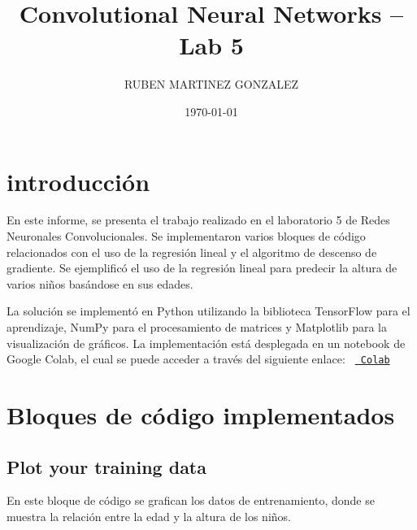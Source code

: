 \documentclass{article}
\title{Convolutional Neural Networks – Lab 5}
\author{RUBEN MARTINEZ GONZALEZ}
\date{\today}
\begin{document}
    \maketitle


    \section{introducción}\label{sec:introduccion}
    En este informe, se presenta el trabajo realizado en el laboratorio 5 de Redes Neuronales Convolucionales.
    Se implementaron varios bloques de código relacionados con el uso de la regresión lineal y el algoritmo de descenso de gradiente.
    Se ejemplificó el uso de la regresión lineal para predecir la altura de varios niños basándose en sus edades.

    \noindent
    La solución se implementó en Python utilizando la biblioteca TensorFlow para el aprendizaje, NumPy para el procesamiento de matrices y Matplotlib para la visualización de gráficos.
    La implementación está desplegada en un notebook de Google Colab, el cual se puede acceder a través del siguiente enlace:
    \texttt{%
        \href{https://colab.research.google.com/drive/1H1AKbWHVSPwCeDJuhiwpH5MEBkk3qcgb?usp=sharing}{%
            Colab}%
    }


    \section{Bloques de código implementados}\label{sec:bloques-de-codigo-implementados}

    \subsection{Plot your training data}\label{subsec:plot-training-data}
    En este bloque de código se grafican los datos de entrenamiento, donde se muestra la relación entre la edad y la altura de los niños.
\end{document}
